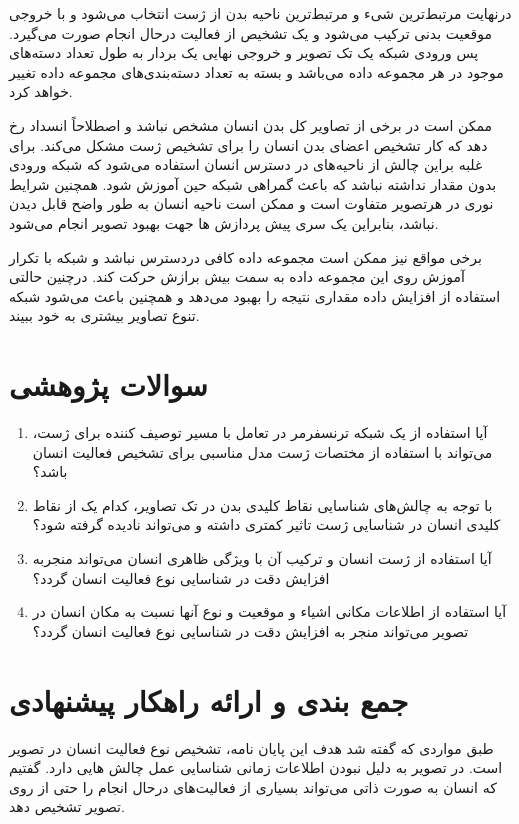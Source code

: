 درنهایت مرتبط‌ترین شیء و مرتبط‌ترین ناحیه بدن از ژست انتخاب می‌شود و با خروجی موقعیت بدنی ترکیب می‌شود و یک تشخیص از فعالیت درحال انجام صورت می‌گیرد. پس ورودی شبکه یک تک تصویر و خروجی نهایی یک بردار به طول تعداد دسته‌های موجود در هر مجموعه داده می‌باشد و بسته به تعداد دسته‌بندی‌های مجموعه داده تغییر خواهد کرد. 

ممکن است در برخی از تصاویر کل بدن انسان مشخص نباشد و اصطلاحاً انسداد رخ دهد که کار تشخیص اعضای بدن انسان را برای تشخیص ژست مشکل می‌کند. برای غلبه براین چالش از ناحیه‌های در دسترس انسان استفاده می‌شود که شبکه ورودی بدون مقدار نداشته نباشد که باعث گمراهی شبکه حین آموزش شود. همچنین شرایط نوری در هرتصویر متفاوت است و ممکن است ناحیه انسان به طور واضح قابل دیدن نباشد، بنابراین یک سری پیش پردازش ها جهت بهبود تصویر انجام می‌شود.

برخی مواقع نیز ممکن است مجموعه داده کافی دردسترس نباشد و شبکه با تکرار آموزش روی این مجموعه داده به سمت بیش برازش حرکت کند. درچنین حالتی استفاده از افزایش داده مقداری نتیجه را بهبود می‌دهد و همچنین باعث می‌شود شبکه تنوع تصاویر بیشتری به خود ببیند.
\section{سوالات پژوهشی} 
\begin{enumerate}
	\item 
	آیا استفاده از یک شبکه ترنسفرمر در تعامل با مسیر توصیف کننده برای ژست، می‌تواند با استفاده از مختصات ژست مدل مناسبی برای تشخیص فعالیت انسان باشد؟
	\item
	با توجه به چالش‌های شناسایی نقاط کلیدی بدن در تک تصاویر، کدام یک از نقاط کلیدی انسان در شناسایی ژست تاثیر کمتری داشته و می‌‌تواند نادیده گرفته شود؟
	\item
	آیا استفاده از ژست انسان و ترکیب آن با ویژگی ظاهری انسان می‌تواند منجربه افزایش دقت در شناسایی نوع فعالیت انسان گردد؟
	\item
	آیا استفاده از اطلاعات مکانی اشیاء و موقعیت و نوع آنها نسبت به مکان انسان در تصویر می‌تواند منجر به افزایش دقت در شناسایی نوع فعالیت انسان گردد؟
\end{enumerate}
\section{جمع بندی و ارائه راهکار پیشنهادی} 

طبق مواردی که گفته شد هدف این پایان نامه، تشخیص نوع فعالیت انسان در تصویر است. در تصویر به دلیل نبودن اطلاعات زمانی شناسایی عمل چالش هایی دارد. گفتیم که انسان به صورت ذاتی می‌تواند بسیاری از فعالیت‌های درحال انجام را حتی از روی تصویر تشخیص دهد.

